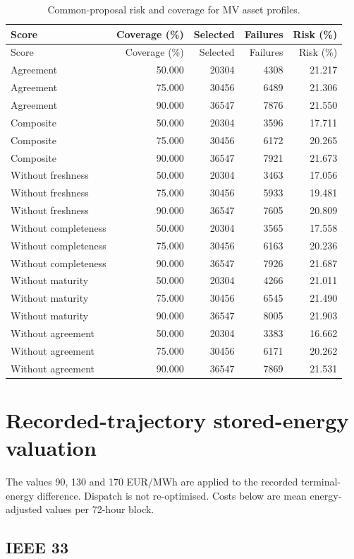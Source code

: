 \documentclass[11pt]{article}
\begin{document}
\small\begin{longtable}{lrrrr}
\caption{Common-proposal risk and coverage for MV asset profiles.}\\\toprule
Score & Coverage (\%) & Selected & Failures & Risk (\%)\\\midrule
\endfirsthead
\toprule
Score & Coverage (\%) & Selected & Failures & Risk (\%)\\\midrule
\endhead
\bottomrule\endfoot
Agreement & 50.000 & 20304 & 4308 & 21.217\\
Agreement & 75.000 & 30456 & 6489 & 21.306\\
Agreement & 90.000 & 36547 & 7876 & 21.550\\
Composite & 50.000 & 20304 & 3596 & 17.711\\
Composite & 75.000 & 30456 & 6172 & 20.265\\
Composite & 90.000 & 36547 & 7921 & 21.673\\
Without freshness & 50.000 & 20304 & 3463 & 17.056\\
Without freshness & 75.000 & 30456 & 5933 & 19.481\\
Without freshness & 90.000 & 36547 & 7605 & 20.809\\
Without completeness & 50.000 & 20304 & 3565 & 17.558\\
Without completeness & 75.000 & 30456 & 6163 & 20.236\\
Without completeness & 90.000 & 36547 & 7926 & 21.687\\
Without maturity & 50.000 & 20304 & 4266 & 21.011\\
Without maturity & 75.000 & 30456 & 6545 & 21.490\\
Without maturity & 90.000 & 36547 & 8005 & 21.903\\
Without agreement & 50.000 & 20304 & 3383 & 16.662\\
Without agreement & 75.000 & 30456 & 6171 & 20.262\\
Without agreement & 90.000 & 36547 & 7869 & 21.531\\
\end{longtable}\normalsize
\section{Recorded-trajectory stored-energy valuation}
The values 90, 130 and 170 EUR/MWh are applied to the recorded terminal-energy difference. Dispatch is not re-optimised. Costs below are mean energy-adjusted values per 72-hour block.
\subsection{IEEE 33}
\end{document}
